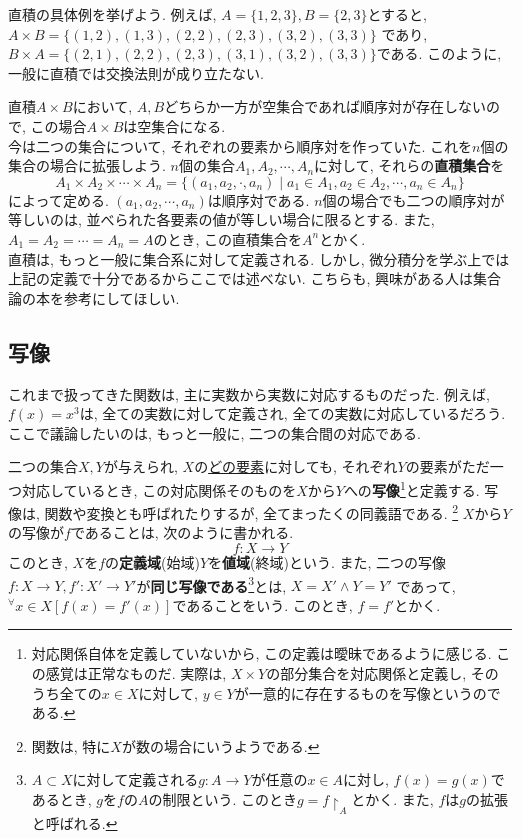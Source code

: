 \documentclass[a4j,dvipdfmx]{jsarticle}
\numberwithin{equation}{section}
\begin{document}
            直積の具体例を挙げよう. 例えば, $A=\{1,2,3\},B=\{2,3\}$とすると, $A\times B=\{(1,2),(1,3),(2,2),(2,3),(3,2),(3,3)\}$
            であり, $B\times A = \{(2,1),(2,2),(2,3),(3,1),(3,2),(3,3)\}$である. このように, 一般に直積では交換法則が成り立たない.

            直積$A\times B$において, $A,B$どちらか一方が空集合であれば順序対が存在しないので, この場合$A\times B$は空集合になる.\\

            今は二つの集合について, それぞれの要素から順序対を作っていた. これを$n$個の集合の場合に拡張しよう. $n$個の集合$A_1,A_2,\cdots,A_n$に対して, 
            それらの\textbf{直積集合}を
            \begin{equation}
                A_1\times A_2 \times \cdots \times A_n = \{(a_1,a_2,\cdot,a_n)\mid a_1\in A_1,a_2\in A_2,\cdots,a_n\in A_n\} \label{eq:集合論基礎:n個の直積の定義}
            \end{equation}
            によって定める. $(a_1,a_2,\cdots,a_n)$は順序対である. $n$個の場合でも二つの順序対が等しいのは, 並べられた各要素の値が等しい場合に限るとする.
            また, $A_1=A_2=\cdots=A_n=A$のとき, この直積集合を$A^n$とかく.\\

            直積は, もっと一般に集合系に対して定義される. しかし, 微分積分を学ぶ上では上記の定義で十分であるからここでは述べない.
            こちらも, 興味がある人は集合論の本を参考にしてほしい.
        \clearpage
        \subsection{写像}
            これまで扱ってきた関数は, 主に実数から実数に対応するものだった. 例えば, $f(x)=x^3$は, 全ての実数に対して定義され, 全ての実数に対応しているだろう.
            ここで議論したいのは, もっと一般に, 二つの集合間の対応である.
            
            二つの集合$X,Y$が与えられ, $X$の\underline{どの要素}に対しても, それぞれ$Y$の要素がただ一つ対応しているとき, この対応関係そのものを$X$から$Y$への\textbf{写像}\footnote{対応関係自体を定義していないから, この定義は曖昧であるように感じる. この感覚は正常なものだ. 実際は, $X\times Y$の部分集合を対応関係と定義し, そのうち全ての$x\in X$に対して, $y\in Y$が一意的に存在するものを写像というのである.}と定義する.
            写像は, 関数や変換とも呼ばれたりするが, 全てまったくの同義語である. \footnote{関数は, 特に$X$が数の場合にいうようである.} $X$から$Y$の写像が$f$であることは, 次のように書かれる.
            \begin{equation}
                f:X\rightarrow Y \label{eq:集合論基礎:写像の書き方}
            \end{equation}
            このとき, $X$を$f$の\textbf{定義域}(始域)$Y$を\textbf{値域}(終域)という. また, 二つの写像$f:X\rightarrow Y, f':X'\rightarrow Y'$が\textbf{同じ写像である}\footnote{$A\subset X$に対して定義される$g:A\rightarrow Y$が任意の$x\in A$に対し, $f(x)=g(x)$であるとき, $g$を$f$の$A$の制限という. このとき$g=f\upharpoonright_A$とかく. また, $f$は$g$の拡張と呼ばれる.}とは, $X=X'\land Y=Y'$
            であって, $^\forall x\in X [f(x)=f'(x)]$であることをいう. このとき, $f=f'$とかく.
\end{document}
